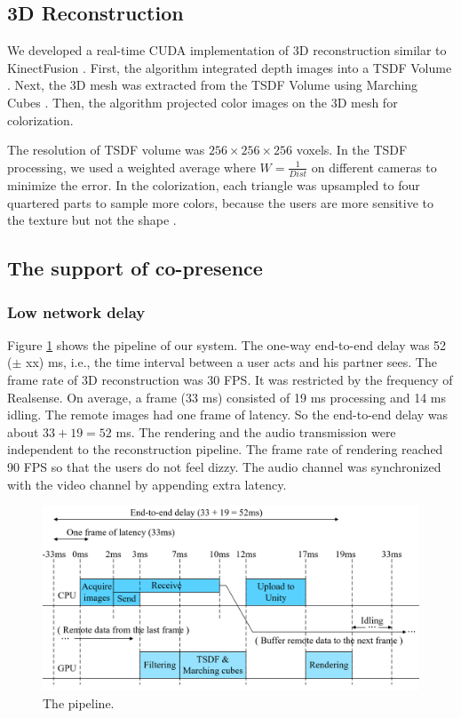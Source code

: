 \subsection{3D Reconstruction}

We developed a real-time CUDA implementation of 3D reconstruction similar to KinectFusion \cite{izadi2011kinectfusion}. First, the algorithm integrated depth images into a TSDF Volume \cite{curless1996volumetric}. Next, the 3D mesh was extracted from the TSDF Volume using Marching Cubes \cite{lorensen1987marching}. Then, the algorithm projected color images on the 3D mesh for colorization.

The resolution of TSDF volume was $256 \times 256 \times 256$ voxels. In the TSDF processing, we used a weighted average where $W = \frac{1}{Dist}$ on different cameras to minimize the error. In the colorization, each triangle was upsampled to four quartered parts to sample more colors, because the users are more sensitive to the texture but not the shape \cite{sander2001texture}.

\subsection{The support of co-presence}

\subsubsection{Low network delay}

Figure \ref{fig:system_delay} shows the pipeline of our system. The one-way end-to-end delay was 52 ($\pm$ xx) ms, i.e., the time interval between a user acts and his partner sees. The frame rate of 3D reconstruction was 30 FPS. It was restricted by the frequency of Realsense. On average, a frame (33 ms) consisted of 19 ms processing and 14 ms idling. The remote images had one frame of latency. So the end-to-end delay was about $33 + 19 = 52$ ms. The rendering and the audio transmission were independent to the reconstruction pipeline. The frame rate of rendering reached 90 FPS so that the users do not feel dizzy. The audio channel was synchronized with the video channel by appending extra latency.

\begin{figure}[!htbp]
\centering
\includegraphics[width=1.0\linewidth]{figures/figure_pipeline_new3.png}
\caption{The pipeline.}
\label{fig:system_delay}
\end{figure}

